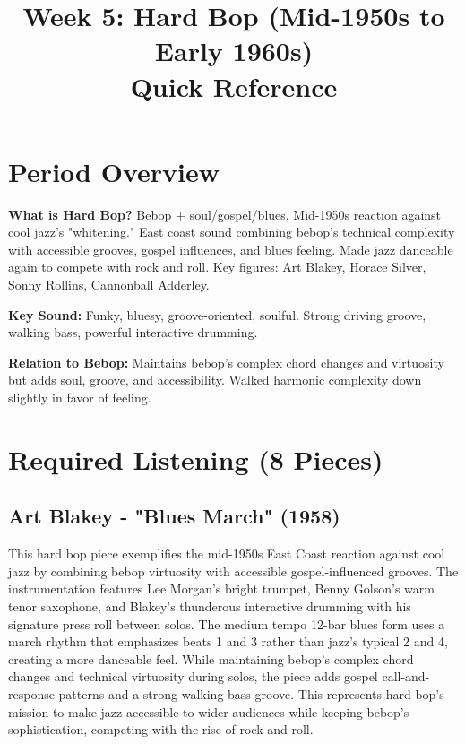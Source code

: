 \documentclass[11pt]{article}
\title{\textbf{Week 5: Hard Bop (Mid-1950s to Early 1960s)} \\ \large Quick Reference}
\author{}
\date{}
\begin{document}
\maketitle

\section*{Period Overview}

\textbf{What is Hard Bop?} Bebop + soul/gospel/blues. Mid-1950s reaction against cool jazz's "whitening." East coast sound combining bebop's technical complexity with accessible grooves, gospel influences, and blues feeling. Made jazz danceable again to compete with rock and roll. Key figures: Art Blakey, Horace Silver, Sonny Rollins, Cannonball Adderley.

\textbf{Key Sound:} Funky, bluesy, groove-oriented, soulful. Strong driving groove, walking bass, powerful interactive drumming.

\textbf{Relation to Bebop:} Maintains bebop's complex chord changes and virtuosity but adds soul, groove, and accessibility. Walked harmonic complexity down slightly in favor of feeling.

\section*{Required Listening (8 Pieces)}

\subsection*{Art Blakey - "Blues March" (1958)}
This hard bop piece exemplifies the mid-1950s East Coast reaction against cool jazz by combining bebop virtuosity with accessible gospel-influenced grooves. The instrumentation features Lee Morgan's bright trumpet, Benny Golson's warm tenor saxophone, and Blakey's thunderous interactive drumming with his signature press roll between solos. The medium tempo 12-bar blues form uses a march rhythm that emphasizes beats 1 and 3 rather than jazz's typical 2 and 4, creating a more danceable feel. While maintaining bebop's complex chord changes and technical virtuosity during solos, the piece adds gospel call-and-response patterns and a strong walking bass groove. This represents hard bop's mission to make jazz accessible to wider audiences while keeping bebop's sophistication, competing with the rise of rock and roll.
\end{document}
